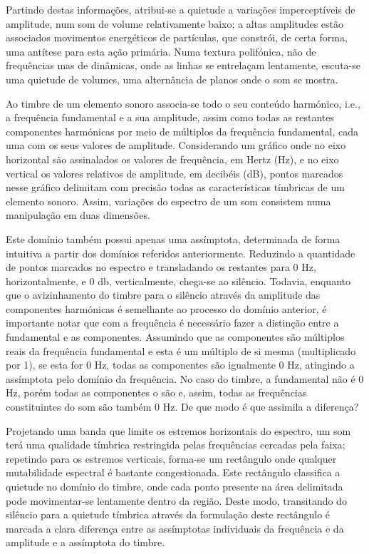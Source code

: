 \documentclass[../main.tex]{subfiles}
\begin{document}
Partindo destas informações, atribui-se a quietude a variações imperceptíveis de amplitude, num som de volume relativamente baixo; a altas amplitudes estão associados movimentos energéticos de partículas, que constrói, de certa forma, uma antítese para esta ação primária. Numa textura polifónica, não de frequências mas de dinâmicas, onde as linhas se entrelaçam lentamente, escuta-se uma quietude de volumes, uma alternância de planos onde o som se mostra.


Ao timbre de um elemento sonoro associa-se todo o seu conteúdo harmónico, i.e., a frequência fundamental e a sua amplitude, assim como todas as restantes componentes harmónicas por meio de múltiplos da frequência fundamental, cada uma com os seus valores de amplitude. Considerando um gráfico onde no eixo horizontal são assinalados os valores de frequência, em Hertz (Hz), e no eixo vertical os valores relativos de amplitude, em decibéis (dB), pontos marcados nesse gráfico delimitam com precisão todas as características tímbricas de um elemento sonoro. Assim, variações do espectro de um som consistem numa manipulação em duas dimensões.

Este domínio também possui apenas uma assímptota, determinada de forma intuitiva a partir dos domínios referidos anteriormente. Reduzindo a quantidade de pontos marcados no espectro e transladando os restantes para 0 Hz, horizontalmente, e 0 db, verticalmente, chega-se ao silêncio. Todavia, enquanto que o avizinhamento do timbre para o silêncio através da amplitude das componentes harmónicas é semelhante ao processo do domínio anterior, é importante notar que com a frequência é necessário fazer a distinção entre a fundamental e as componentes. Assumindo que as componentes são múltiplos reais da frequência fundamental e esta é um múltiplo de si mesma (multiplicado por 1), se esta for 0 Hz, todas as componentes são igualmente 0 Hz, atingindo a assímptota pelo domínio da frequência. No caso do timbre, a fundamental não é 0 Hz, porém todas as componentes o são e, assim, todas as frequências constituintes do som são também 0 Hz. De que modo é que assimila a diferença?

Projetando uma banda que limite os estremos horizontais do espectro, um som terá uma qualidade tímbrica restringida pelas frequências cercadas pela faixa; repetindo para os estremos verticais, forma-se um rectângulo onde qualquer mutabilidade espectral é bastante congestionada. Este rectângulo classifica a quietude no domínio do timbre, onde cada ponto presente na área delimitada pode movimentar-se lentamente dentro da região. Deste modo, transitando do silêncio para a quietude tímbrica através da formulação deste rectângulo é marcada a clara diferença entre as assímptotas individuais da frequência e da amplitude e a assímptota do timbre.
\end{document}
